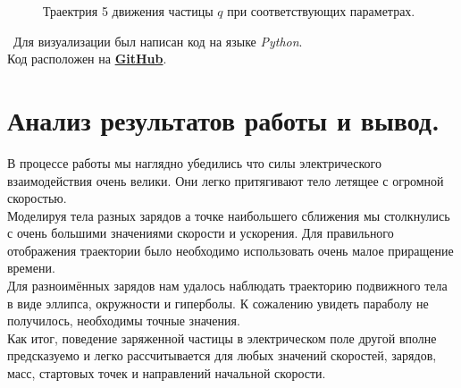 \documentclass[a5paper, 10pt]{article}
\theoremstyle{definition}
\theoremstyle{plain}
\theoremstyle{remark}
\begin{document}
\begin{figure}[h!]
\caption{Траектрия 5 движения частицы $q$ при соответствующих параметрах.}
\end{figure}



\newpage

\newpage
\,
\newpage
Для визуализации был написан код на языке \textit{Python}. \\
Код расположен на \href{https://github.com/a-nechaeva/phys_project_2/blob/main/python_code/electric_move.py}{\textbf{GitHub}}.

\section{Анализ результатов работы и вывод.}
В процессе работы мы наглядно убедились что силы электрического взаимодействия очень велики. Они легко притягивают тело летящее с огромной скоростью.\\
Моделируя тела разных зарядов а точке наибольшего сближения мы столкнулись с очень большими значениями скорости и ускорения. Для правильного отображения траектории было необходимо использовать очень малое приращение времени.\\
Для разноимённых зарядов нам удалось наблюдать траекторию подвижного тела в виде эллипса, окружности и гиперболы. К сожалению увидеть параболу не получилось, необходимы точные значения.\\
Как итог, поведение заряженной частицы в электрическом поле другой вполне предсказуемо и легко рассчитывается для любых значений скоростей, зарядов, масс, стартовых точек и направлений начальной скорости.
\end{document}
